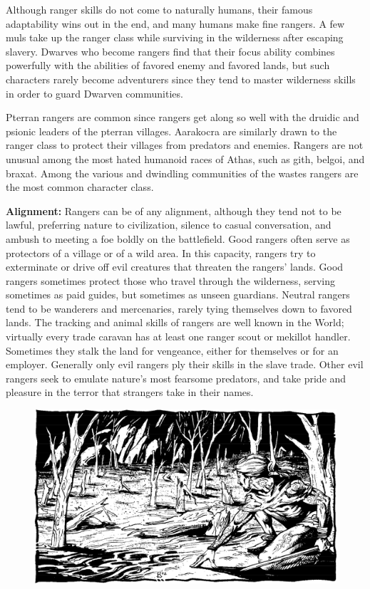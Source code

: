 Although ranger skills do not come to naturally humans, their famous adaptability wins out in the end, and many humans make fine rangers. A few muls take up the ranger class while surviving in the wilderness after escaping slavery. Dwarves who become rangers find that their focus ability combines powerfully with the abilities of favored enemy and favored lands, but such characters rarely become adventurers since they tend to master wilderness skills in order to guard Dwarven communities.

Pterran rangers are common since rangers get along so well with the druidic and psionic leaders of the pterran villages. Aarakocra are similarly drawn to the ranger class to protect their villages from predators and enemies. Rangers are not unusual among the most hated humanoid races of Athas, such as gith, belgoi, and braxat. Among the various and dwindling communities of the wastes rangers are the most common character class.

\textbf{Alignment:} Rangers can be of any alignment, although they tend not to be lawful, preferring nature to civilization, silence to casual conversation, and ambush to meeting a foe boldly on the battlefield. Good rangers often serve as protectors of a village or of a wild area. In this capacity, rangers try to exterminate or drive off evil creatures that threaten the rangers' lands. Good rangers sometimes protect those who travel through the wilderness, serving sometimes as paid guides, but sometimes as unseen guardians. Neutral rangers tend to be wanderers and mercenaries, rarely tying themselves down to favored lands. The tracking and animal skills of rangers are well known in the World; virtually every trade caravan has at least one ranger scout or mekillot handler. Sometimes they stalk the land for vengeance, either for themselves or for an employer. Generally only evil rangers ply their skills in the slave trade. Other evil rangers seek to emulate nature's most fearsome predators, and take pride and pleasure in the terror that strangers take in their names.

\begin{figure}[h!]
\centering
\includegraphics[width=\textwidth]{images/ranger-2.png}
\WOTC
\end{figure}

